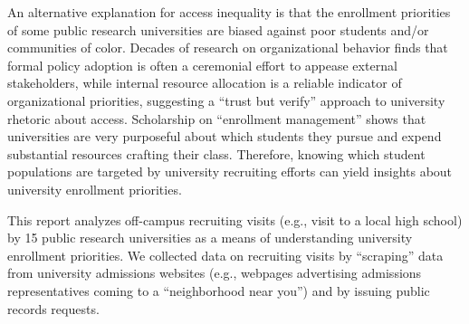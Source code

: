 \documentclass[twoside]{article}
\begin{document}
An alternative explanation for access inequality is that the enrollment priorities of some public research universities are biased against poor students and/or communities of color. Decades of research on organizational behavior finds that formal policy adoption is often a ceremonial effort to appease external stakeholders, while internal resource allocation is a reliable indicator of organizational priorities, suggesting a ``trust but verify'' approach to university rhetoric about access. Scholarship on ``enrollment management'' shows that universities are very purposeful about which students they pursue and expend substantial resources crafting their class.  Therefore, knowing which student populations are targeted by university recruiting efforts can yield insights about university enrollment priorities.

This report analyzes off-campus recruiting visits (e.g., visit to a local high school) by 15 public research universities as a means of understanding university enrollment priorities. We collected data on recruiting visits by ``scraping'' data from university admissions websites (e.g., webpages advertising admissions representatives coming to a ``neighborhood near you'') and by issuing public records requests. 
\end{document}
